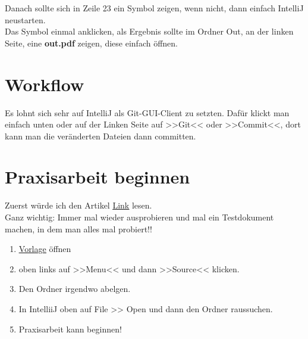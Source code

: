 \documentclass[11pt]{article}
\begin{document}
    Danach sollte sich in Zeile 23 ein Symbol zeigen, wenn nicht, dann einfach IntelliJ neustarten. \\

    Das Symbol einmal anklicken, als Ergebnis sollte im Ordner Out, an der linken Seite, eine \textbf{out.pdf} zeigen, diese einfach öffnen.


    \section{Workflow}\label{sec:workflow}

    Es lohnt sich sehr auf IntelliJ als Git-GUI-Client zu setzten.
    Dafür klickt man einfach unten oder auf der Linken Seite auf >>Git<< oder >>Commit<<, dort kann man die veränderten Dateien dann committen.

    \section{Praxisarbeit beginnen}\label{sec:praxisarbeit-beginnen}

    Zuerst würde ich den Artikel \href{https://www.overleaf.com/learn/latex/Learn_LaTeX_in_30_minutes}{\underline{Link}} lesen. \\
    Ganz wichtig: Immer mal wieder ausprobieren und mal ein Testdokument machen, in dem man alles mal probiert!!
    \begin{enumerate}
        \item \href{https://www.overleaf.com/read/yrndghycwxgb}{\underline{Vorlage}} öffnen
        \item oben links auf >>Menu<< und dann >>Source<< klicken.
        \item Den Ordner irgendwo abelgen.
        \item  In IntelliiJ oben auf File >> Open und dann den Ordner raussuchen. \\
        \item Praxisarbeit kann beginnen!
    \end{enumerate}
\end{document}
